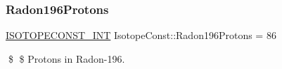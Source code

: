 \subsubsection{\texorpdfstring{Radon196\+Protons}{Radon196Protons}}
{\footnotesize\ttfamily \mbox{\hyperlink{group___isotope_const-_macros_ga5f18360b3e99483a35c32d789e62621c}{I\+S\+O\+T\+O\+P\+E\+C\+O\+N\+S\+T\+\_\+\+I\+NT}} Isotope\+Const\+::\+Radon196\+Protons = 86}

\$ \$ Protons in Radon-\/196. 